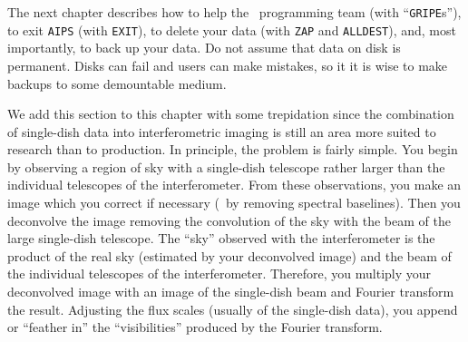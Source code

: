 

     The next chapter describes how to help the \AIPS\ programming
team (with ``{\tt GRIPE}s''), to exit {\tt AIPS} (with {\tt EXIT}), to
delete your data (with {\tt ZAP} and {\tt ALLDEST}), and, most
importantly, to back up your data.  Do not assume that data on disk is
permanent.  Disks can fail and users can make mistakes, so it
it is wise to make backups to some demountable medium.


     We add this section to this chapter with some trepidation since
the combination of single-dish data into interferometric imaging is
still an area more suited to research than to production.  In
principle, the problem is fairly simple.  You begin by observing a
region of sky with a single-dish telescope rather larger than the
individual telescopes of the interferometer.  From these observations,
you make an image which you correct if necessary (\eg\ by removing
spectral baselines).  Then you deconvolve the image removing the
convolution of the sky with the beam of the large single-dish
telescope.  The ``sky'' observed with the interferometer is the
product of the real sky (estimated by your deconvolved image) and the
beam of the individual telescopes of the interferometer.  Therefore,
you multiply your deconvolved image with an image of the single-dish
beam and Fourier transform the result.  Adjusting the flux scales
(usually of the single-dish data), you append or ``feather in'' the
``visibilities'' produced by the Fourier transform.

